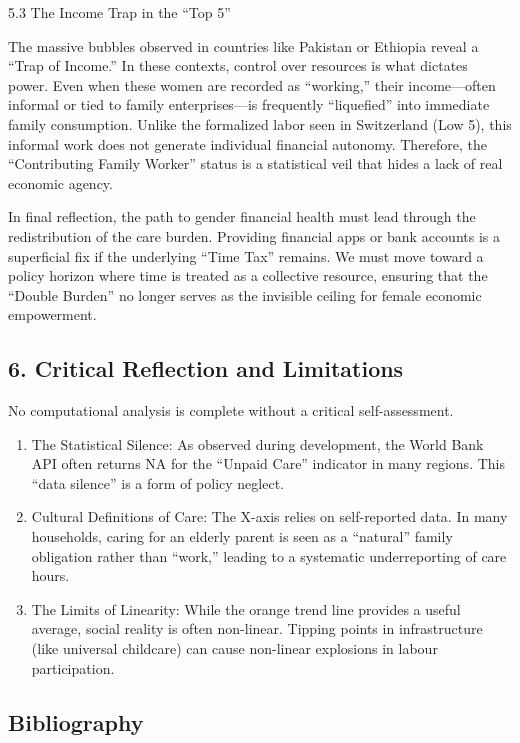 \documentclass[
  letterpaper,
  DIV=11,
  numbers=noendperiod]{scrartcl}
\begin{document}
5.3 The Income Trap in the ``Top 5''

The massive bubbles observed in countries like Pakistan or Ethiopia
reveal a ``Trap of Income.'' In these contexts, control over resources
is what dictates power. Even when these women are recorded as
``working,'' their income---often informal or tied to family
enterprises---is frequently ``liquefied'' into immediate family
consumption. Unlike the formalized labor seen in Switzerland (Low 5),
this informal work does not generate individual financial autonomy.
Therefore, the ``Contributing Family Worker'' status is a statistical
veil that hides a lack of real economic agency.

In final reflection, the path to gender financial health must lead
through the redistribution of the care burden. Providing financial apps
or bank accounts is a superficial fix if the underlying ``Time Tax''
remains. We must move toward a policy horizon where time is treated as a
collective resource, ensuring that the ``Double Burden'' no longer
serves as the invisible ceiling for female economic empowerment.

\subsection{6. Critical Reflection and
Limitations}\label{critical-reflection-and-limitations}

No computational analysis is complete without a critical
self-assessment.

\begin{enumerate}
\def\labelenumi{\arabic{enumi}.}
\item
  The Statistical Silence: As observed during development, the World
  Bank API often returns NA for the ``Unpaid Care'' indicator in many
  regions. This ``data silence'' is a form of policy neglect.
\item
  Cultural Definitions of Care: The X-axis relies on self-reported data.
  In many households, caring for an elderly parent is seen as a
  ``natural'' family obligation rather than ``work,'' leading to a
  systematic underreporting of care hours.
\item
  The Limits of Linearity: While the orange trend line provides a useful
  average, social reality is often non-linear. Tipping points in
  infrastructure (like universal childcare) can cause non-linear
  explosions in labour participation.
\end{enumerate}

\subsection{Bibliography}\label{bibliography}
\end{document}
